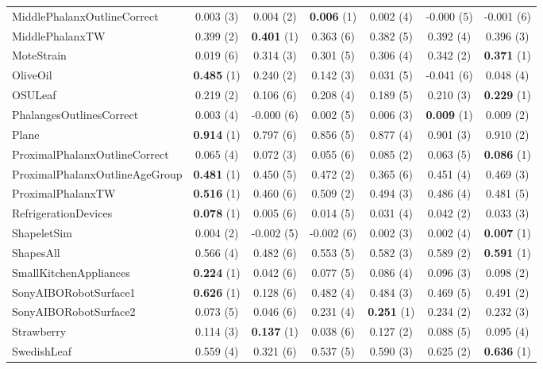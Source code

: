 \begin{table}[ht]
\begin{adjustbox}{width=\textwidth}
\begin{tabular}{lcccccc}
    MiddlePhalanxOutlineCorrect & 0.003 (3) & 0.004 (2) & \textbf{0.006} (1) & 0.002 (4) & -0.000 (5) & -0.001 (6) \\
    MiddlePhalanxTW & 0.399 (2) & \textbf{0.401} (1) & 0.363 (6) & 0.382 (5) & 0.392 (4) & 0.396 (3) \\
    MoteStrain & 0.019 (6) & 0.314 (3) & 0.301 (5) & 0.306 (4) & 0.342 (2) & \textbf{0.371} (1) \\
    OliveOil & \textbf{0.485} (1) & 0.240 (2) & 0.142 (3) & 0.031 (5) & -0.041 (6) & 0.048 (4) \\
    OSULeaf & 0.219 (2) & 0.106 (6) & 0.208 (4) & 0.189 (5) & 0.210 (3) & \textbf{0.229} (1) \\
    PhalangesOutlinesCorrect & 0.003 (4) & -0.000 (6) & 0.002 (5) & 0.006 (3) & \textbf{0.009} (1) & 0.009 (2) \\
    Plane & \textbf{0.914} (1) & 0.797 (6) & 0.856 (5) & 0.877 (4) & 0.901 (3) & 0.910 (2) \\
    ProximalPhalanxOutlineCorrect & 0.065 (4) & 0.072 (3) & 0.055 (6) & 0.085 (2) & 0.063 (5) & \textbf{0.086} (1) \\
    ProximalPhalanxOutlineAgeGroup & \textbf{0.481} (1) & 0.450 (5) & 0.472 (2) & 0.365 (6) & 0.451 (4) & 0.469 (3) \\
    ProximalPhalanxTW & \textbf{0.516} (1) & 0.460 (6) & 0.509 (2) & 0.494 (3) & 0.486 (4) & 0.481 (5) \\
    RefrigerationDevices & \textbf{0.078} (1) & 0.005 (6) & 0.014 (5) & 0.031 (4) & 0.042 (2) & 0.033 (3) \\
    ShapeletSim & 0.004 (2) & -0.002 (5) & -0.002 (6) & 0.002 (3) & 0.002 (4) & \textbf{0.007} (1) \\
    ShapesAll & 0.566 (4) & 0.482 (6) & 0.553 (5) & 0.582 (3) & 0.589 (2) & \textbf{0.591} (1) \\
    SmallKitchenAppliances & \textbf{0.224} (1) & 0.042 (6) & 0.077 (5) & 0.086 (4) & 0.096 (3) & 0.098 (2) \\
    SonyAIBORobotSurface1 & \textbf{0.626} (1) & 0.128 (6) & 0.482 (4) & 0.484 (3) & 0.469 (5) & 0.491 (2) \\
    SonyAIBORobotSurface2 & 0.073 (5) & 0.046 (6) & 0.231 (4) & \textbf{0.251} (1) & 0.234 (2) & 0.232 (3) \\
    Strawberry & 0.114 (3) & \textbf{0.137} (1) & 0.038 (6) & 0.127 (2) & 0.088 (5) & 0.095 (4) \\
    SwedishLeaf & 0.559 (4) & 0.321 (6) & 0.537 (5) & 0.590 (3) & 0.625 (2) & \textbf{0.636} (1) \\

\end{tabular}
\end{adjustbox}
\end{table}
